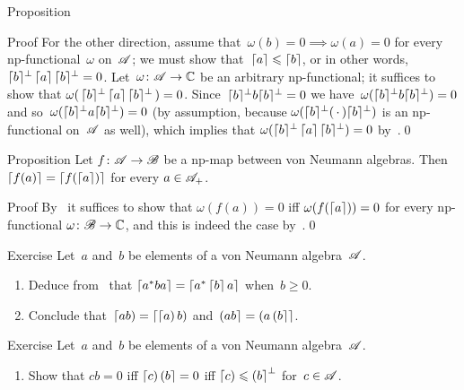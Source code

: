 \documentclass[a]{subfiles}
\begin{document}
\begin{parsec}
\begin{point}{Proposition}
\begin{point}{Proof}
For the other direction,
assume that~$\omega(b)=0\implies \omega(a)=0$
for every np-functional~$\omega$ on~$\mathscr{A}$;
we must show that~$\left\lceil a\right\rceil\leqslant \left\lceil b\right\rceil$,
or in other words, $\smash{\left\lceil b\right\rceil}^\perp \left\lceil a\right\rceil\smash{\left\lceil b\right\rceil}^\perp =0$.
Let~$\omega\colon \mathscr{A}\to\mathbb{C}$ be an arbitrary np-functional;
it suffices to show that 
$\omega(\,\smash{\left\lceil b\right\rceil}^\perp \left\lceil a\right\rceil\smash{\left\lceil b\right\rceil}^\perp \,)=0$.
Since~$\smash{\left\lceil b\right\rceil}^\perp b \smash{\left\lceil b\right\rceil}^\perp =0$
we have~$\omega(\smash{\left\lceil b\right\rceil}^\perp b\smash{\left\lceil b\right\rceil}^\perp)=0$
and so~$\omega(\smash{\left\lceil b\right\rceil}^\perp a \smash{\left\lceil b\right\rceil}^\perp)=0$
(by assumption, because
$\omega(\smash{\left\lceil b\right\rceil}^\perp(\,\cdot\,)\smash{\left\lceil b\right\rceil}^\perp)$
is an np-functional on~$\mathscr{A}$ as well),
which implies that
$\omega(\smash{\left\lceil b\right\rceil}^\perp\left\lceil a\right\rceil\smash{\left\lceil b\right\rceil}^\perp)=0$
by~.\qed
\end{point}
\end{point}
\begin{point}{Proposition}%
Let $f\colon \mathscr{A}\to\mathscr{B}$ be a np-map
between von Neumann algebras.
Then $\left\lceil f(a)\right\rceil=\left\lceil f(\left\lceil a\right\rceil)\right\rceil$
for every $a\in\mathscr{A}_+$.
\begin{point}{Proof}%
By~
it suffices to show that
$\omega(f(a))=0$ iff $\omega(f(\left\lceil a\right\rceil))=0$
for every np-functional $\omega\colon \mathscr{B}\to\mathbb{C}$,
and this is indeed the case by~.\qed
\end{point}
\end{point}
\begin{point}{Exercise}%
Let~$a$ and~$b$ be elements of a von Neumann algebra~$\mathscr{A}$.
\begin{enumerate}
\item
Deduce from~
that
$\left\lceil a^*ba\right\rceil = \left\lceil a^*\left\lceil b\right\rceil a\right\rceil$
when~$b\geq 0$.
\item
Conclude that~$\left\lceil ab\right)=\left\lceil\left\lceil a\right)b\right)$
and~$\left(ab\right\rceil=\left(a\left(b\right\rceil\right\rceil$.

\end{enumerate}
\end{point}
\begin{point}{Exercise}%
Let~$a$ and~$b$ be elements of a von Neumann algebra~$\mathscr{A}$.
\begin{enumerate}
\item
Show that $cb=0$ iff $\left\lceil c\right)\left(b\right\rceil=0$
iff $\left\lceil c\right)\leqslant \left(b\right\rceil^\perp$
for~$c\in\mathscr{A}$.


\end{enumerate}
\end{point}
\end{parsec}
\end{document}
